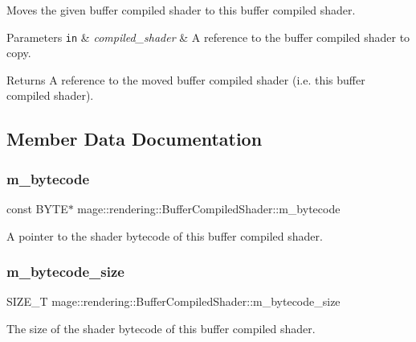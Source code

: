 Moves the given buffer compiled shader to this buffer compiled shader.


\begin{DoxyParams}[1]{Parameters}
\mbox{\tt in}  & {\em compiled\+\_\+shader} & A reference to the buffer compiled shader to copy. \\
\hline
\end{DoxyParams}
\begin{DoxyReturn}{Returns}
A reference to the moved buffer compiled shader (i.\+e. this buffer compiled shader). 
\end{DoxyReturn}


\subsection{Member Data Documentation}
\hypertarget{classmage_1_1rendering_1_1_buffer_compiled_shader_a6caa56491d81612c3eaec789d8e341bc}{}\label{classmage_1_1rendering_1_1_buffer_compiled_shader_a6caa56491d81612c3eaec789d8e341bc} 
\subsubsection{\texorpdfstring{m\+\_\+bytecode}{m\_bytecode}}
{\footnotesize\ttfamily const B\+Y\+TE$\ast$ mage\+::rendering\+::\+Buffer\+Compiled\+Shader\+::m\+\_\+bytecode\hspace{0.3cm}{\ttfamily [private]}}

A pointer to the shader bytecode of this buffer compiled shader. \hypertarget{classmage_1_1rendering_1_1_buffer_compiled_shader_a176f35c25e3a4de26b0334ffdc53da73}{}\label{classmage_1_1rendering_1_1_buffer_compiled_shader_a176f35c25e3a4de26b0334ffdc53da73} 
\subsubsection{\texorpdfstring{m\+\_\+bytecode\+\_\+size}{m\_bytecode\_size}}
{\footnotesize\ttfamily S\+I\+Z\+E\+\_\+T mage\+::rendering\+::\+Buffer\+Compiled\+Shader\+::m\+\_\+bytecode\+\_\+size\hspace{0.3cm}{\ttfamily [private]}}

The size of the shader bytecode of this buffer compiled shader. 